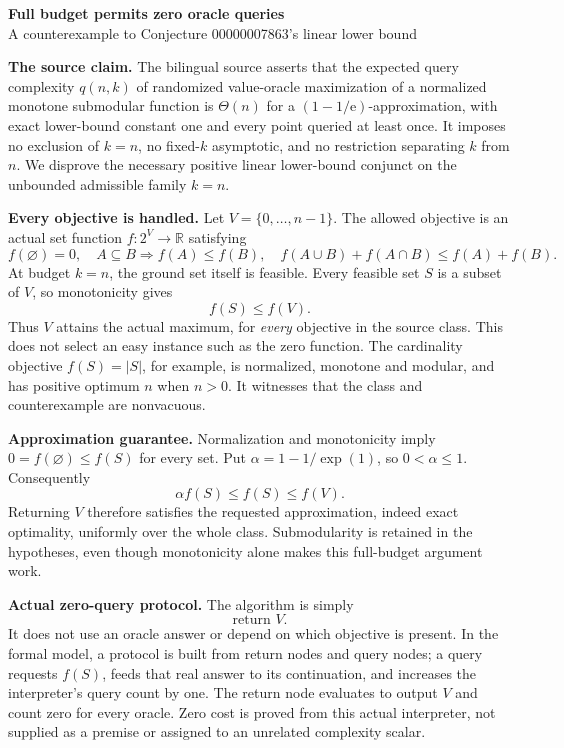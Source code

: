 \documentclass[11pt]{article}
\newcommand{\V}{V}
\newcommand{\E}{\mathrm e}
\begin{document}
\begin{center}
{\Large\bfseries Full budget permits zero oracle queries}\\[7pt]
{\small A counterexample to Conjecture 00000007863's linear lower bound}
\end{center}

\textbf{The source claim.} The bilingual source asserts that the expected
query complexity \(q(n,k)\) of randomized value-oracle maximization of a
normalized monotone submodular function is \(\Theta(n)\) for a
\((1-1/\E)\)-approximation, with exact lower-bound constant one and every
point queried at least once. It imposes no exclusion of \(k=n\), no
fixed-\(k\) asymptotic, and no restriction separating \(k\) from \(n\).
We disprove the necessary positive linear lower-bound conjunct on the
unbounded admissible family \(k=n\).

\textbf{Every objective is handled.} Let \(\V=\{0,\ldots,n-1\}\).
The allowed objective is an actual set function
\(f:2^{\V}\to\mathbb R\) satisfying
\[
 f(\varnothing)=0,\quad A\subseteq B\Longrightarrow f(A)\leq f(B),
 \quad f(A\cup B)+f(A\cap B)\leq f(A)+f(B).
\]
At budget \(k=n\), the ground set itself is feasible. Every feasible
set \(S\) is a subset of \(\V\), so monotonicity gives
\[
 f(S)\leq f(\V).
\]
Thus \(\V\) attains the actual maximum, for \emph{every} objective in
the source class. This does not select an easy instance such as the
zero function. The cardinality objective \(f(S)=|S|\), for example, is
normalized, monotone and modular, and has positive optimum \(n\) when
\(n>0\). It witnesses that the class and counterexample are nonvacuous.

\textbf{Approximation guarantee.} Normalization and monotonicity imply
\(0=f(\varnothing)\leq f(S)\) for every set. Put
\(\alpha=1-1/\exp(1)\), so \(0<\alpha\leq1\). Consequently
\[
 \alpha f(S)\leq f(S)\leq f(\V).
\]
Returning \(\V\) therefore satisfies the requested approximation,
indeed exact optimality, uniformly over the whole class. Submodularity
is retained in the hypotheses, even though monotonicity alone makes
this full-budget argument work.

\textbf{Actual zero-query protocol.} The algorithm is simply
\[
 \text{return }\V.
\]
It does not use an oracle answer or depend on which objective is
present. In the formal model, a protocol is built from return nodes
and query nodes; a query requests \(f(S)\), feeds that real answer to
its continuation, and increases the interpreter's query count by one.
The return node evaluates to output \(\V\) and count zero for every
oracle. Zero cost is proved from this actual interpreter, not supplied
as a premise or assigned to an unrelated complexity scalar.
\end{document}
